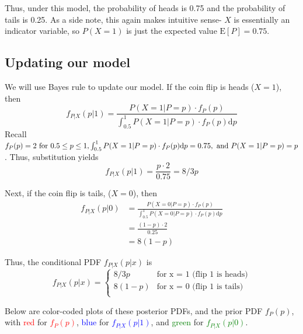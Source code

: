 \documentclass[paper=a4, fontsize=11pt]{scrartcl} %
\numberwithin{equation}{section} %
\numberwithin{figure}{section} %
\numberwithin{table}{section} %
\begin{document}
Thus, under this model, the probability of heads is 0.75 and the probability of tails is 0.25. As a side note, this again makes intuitive sense- $X$ is essentially an indicator variable, so $P(X = 1)$ is just the expected value $\textrm{E}[P] = 0.75$. 

\subsection{Updating our model}

We will use Bayes rule to update our model. If the coin flip is heads ($X = 1$), then
\begin{equation*}
f_{P | X}(p | 1) = \frac{P(X = 1 | P = p) \cdot f_P(p)}{\int_{0.5}^1P(X = 1 | P =  p) \cdot f_P(p) \textrm{d}p}
\end{equation*}
Recall $f_P(p) = 2 \textrm{ for } 0.5 \leq p \leq 1, \int_{0.5}^1P(X = 1 | P = p)\cdot f_P(p) \textrm{d}p = 0.75, \textrm{ and } \\ P(X=1 | P = p) = p$.
Thus, substitution yields
\begin{equation*}
f_{P | X}(p | 1) = \frac{p \cdot 2}{0.75} = 8/3 p
\end{equation*}

Next, if the coin flip is tails, ($X = 0$), then
\begin{align*}
f_{P | X}(p | 0) &= \frac{P(X = 0 | P = p) \cdot f_P(p)}{\int_{0.5}^1P(X = 0 | P =  p) \cdot f_P(p) \textrm{d}p}\\
   &= \frac{(1-p)\cdot 2}{0.25}\\
   &= 8(1-p)
\end{align*}

Thus, the conditional PDF $f_{P | X}(p | x)$ is
\[
f_{P | X}(p | x) = 
\begin{cases}
		8/3 p & \textrm{for x = 1 (flip 1 is heads)} \\
		8 (1-p) & \textrm{for x = 0 (flip 1 is tails)}\\
\end{cases}
\]

Below are color-coded plots of these posterior PDFs, and the prior PDF $f_P(p)$, with \textcolor{red}{red} for \textcolor{red}{$f_P(p)$},  \textcolor{blue}{blue} for \textcolor{blue}{$f_{P | X} (p | 1)$}, and  \textcolor{green}{green} for \textcolor{green}{$f_{P | X} (p | 0)$}.

\begin{center}
\end{center}
\end{document}
